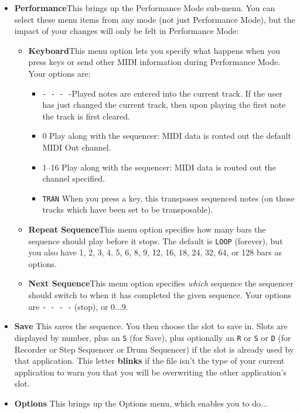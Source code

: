 \documentclass{article}
\begin{document}
\begin{itemize}
\item {\bf Performance}\quad  This brings up the Performance Mode sub-menu.  You can select these menu items from any mode (not just Performance Mode), but the impact of your changes will only be felt in Performance Mode:

\begin{itemize}
\item {\bf Keyboard}\quad  This menu option lets you specify what happens when you press keys or send other MIDI information during Performance Mode.  Your options are:

 \renewcommand\labelitemiii{$\diamond$}
\begin{itemize}
	\item {\texttt{-~-~-~-}}\quad Played notes are entered into the current track.  If the user has just changed the current track, then upon playing the first note the track is first cleared.
	\item {0} \quad Play along with the sequencer: MIDI data is routed out the default MIDI Out channel.
	\item {1--16} \quad Play along with the sequencer: MIDI data is routed out the channel specified.
	\item {\texttt{TRAN}} \quad When you press a key, this transposes sequenced notes (on those tracks which have been set to be transposable).
\end{itemize}

\item {\bf Repeat Sequence}\quad This menu option specifies how many bars the sequence should play before it stops.  The default is {\tt LOOP} (forever), but you also have 1, 2, 3, 4, 5, 6, 8, 9, 12, 16, 18, 24, 32, 64, or 128 bars as options.
\item {\bf Next Sequence}\quad This menu option specifies {\it which} sequence the sequencer should switch to when it has completed the given sequence.  Your options are {\tt - - - -} (stop), or 0...9.
\end{itemize} 

\item {\bf Save} \quad This saves the sequence. You then choose the slot to save in.  Slots are displayed by number, plus an \texttt{S} (for Save), plus optionally an \texttt{R} or \texttt{S} or \texttt{D} (for Recorder or Step Sequencer or Drum Sequencer) if the slot is already used by that application.  This letter {\bf blinks} if the file isn't the type of your current application to warn you that you will be overwriting the other application's slot.

\item {\bf Options} \quad This brings up the Options menu, which enables you to do...
\end{itemize}
\end{document}
